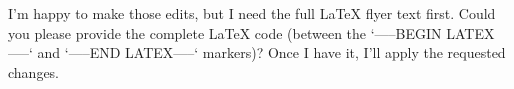 I’m happy to make those edits, but I need the full LaTeX flyer text first. Could you please provide the complete LaTeX code (between the `-----BEGIN LATEX-----` and `-----END LATEX-----` markers)? Once I have it, I’ll apply the requested changes.